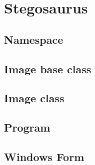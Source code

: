 \chapter{Stegosaurus}
\label{app:A}
\section*{Namespace}

\section*{Image base class}

\section*{Image class}

\section*{Program}

\section*{Windows Form}

